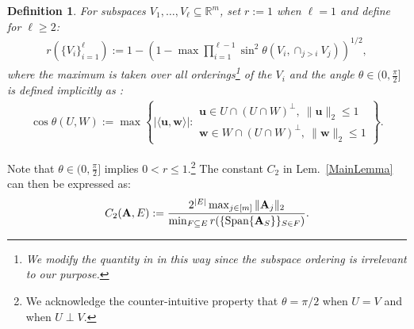 \documentclass[9pt,twocolumn]{pnas-new}
\newtheorem{definition}{Definition}
\begin{document}
\begin{definition}\label{SpecialSupportSet}\label{FriedrichsDefinition}
For subspaces $V_1, \ldots, V_\ell \subseteq \mathbb{R}^m$, set $r := 1$ when $\ell = 1$ and define for $\ell \geq 2$:
\begin{align*}
r(\{V_i\}_{i=1}^\ell) := 1 - \left(1 -  \max \prod_{i=1}^{\ell-1} \sin^2  \theta \left(V_i, \cap_{j>i} V_j \right)  \right)^{1/2},
\end{align*} 
%
where the maximum is taken over all orderings\footnote{We modify the quantity in \cite{Deutsch12} in this way since the subspace ordering is irrelevant to our purpose.} of the $V_i$ and the angle $\theta \in (0,\frac{\pi}{2}]$ is defined implicitly as \cite[Def.~9.4]{Deutsch12}:
\begin{align*}
\cos{\theta(U,W)} := \max\left\{ |\langle \mathbf{u}, \mathbf{w} \rangle|: \substack{ \mathbf{u} \in U \cap (U \cap W)^\perp, \ \|\mathbf{u}\|_2 \leq 1 \\ \mathbf{w} \in W \cap (U \cap W)^\perp, \  \|\mathbf{w}\|_2 \leq 1 } \right\}.
\end{align*}
\end{definition}
Note that $\theta \in (0,\frac{\pi}{2}]$ implies $0 < r \leq 1$.\footnote{We acknowledge the counter-intuitive property that $\theta =  \pi/2$ when $U = V$ and when $U \perp V$.}  %
The constant $C_2$ in Lem.~\ref{MainLemma} can then be expressed as:  %
\begin{align}\label{Cdef2}
C_2(\mathbf{A}, E) := \frac{ 2^{|E|} \max_{j \in [m]} \|\mathbf{A}_j\|_2}{ \min_{F \subseteq E} r( \{ \text{\rm Span}\{\mathbf{A}_{S}\} \}_{S \in F}) }.
\end{align}
\end{document}

